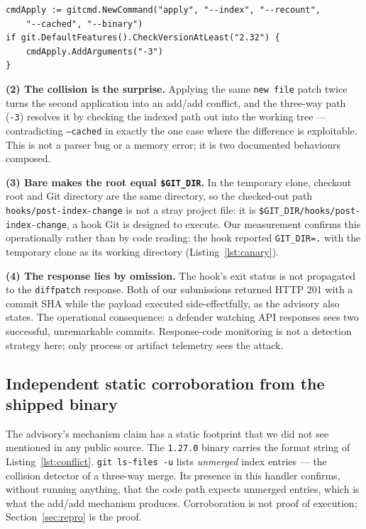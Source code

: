 \documentclass[journal]{IEEEtran}
\begin{document}
\begin{lstlisting}[style=gosrc,
caption={The patch-application command of Gitea 1.27.0, as published in the
\texttt{Details} section of the advisory
(\texttt{services/repository/files/patch.go}).},
label={lst:apply}]
cmdApply := gitcmd.NewCommand("apply", "--index", "--recount",
    "--cached", "--binary")
if git.DefaultFeatures().CheckVersionAtLeast("2.32") {
    cmdApply.AddArguments("-3")
}
\end{lstlisting}

\textbf{(2) The collision is the surprise.} Applying the same
\texttt{new file} patch twice turns the second application into an add/add
conflict, and the three-way path (\texttt{-3}) resolves it by checking the
indexed path out into the working tree --- contradicting \texttt{--cached} in
exactly the one case where the difference is exploitable. This is not a parser
bug or a memory error; it is two documented behaviours composed.

\textbf{(3) Bare makes the root equal \texttt{\$GIT\_DIR}.} In the temporary
clone, checkout root and Git directory are the same directory, so the
checked-out path \texttt{hooks/post-index-change} is not a stray project file:
it is \texttt{\$GIT\_DIR/hooks/post-index-change}, a hook Git is designed to
execute. Our measurement confirms this operationally rather than by code
reading: the hook reported \texttt{GIT\_DIR=.} with the temporary clone as its
working directory (Listing~\ref{lst:canary}).

\textbf{(4) The response lies by omission.} The hook's exit status is not
propagated to the \texttt{diffpatch} response. Both of our submissions returned
HTTP 201 with a commit SHA while the payload executed side-effectfully, as the
advisory also states. The operational consequence: a defender watching API
responses sees two successful, unremarkable commits. Response-code monitoring is
not a detection strategy here; only process or artifact telemetry sees the
attack.

\subsection{Independent static corroboration from the shipped binary}

The advisory's mechanism claim has a static footprint that we did not see
mentioned in any public source. The \texttt{1.27.0} binary carries the format
string of Listing~\ref{lst:conflict}. \texttt{git ls-files -u} lists
\emph{unmerged} index entries --- the collision detector of a three-way merge.
Its presence in this handler confirms, without running anything, that the code
path expects unmerged entries, which is what the add/add mechanism produces.
Corroboration is not proof of execution; Section~\ref{sec:repro} is the proof.
\end{document}

